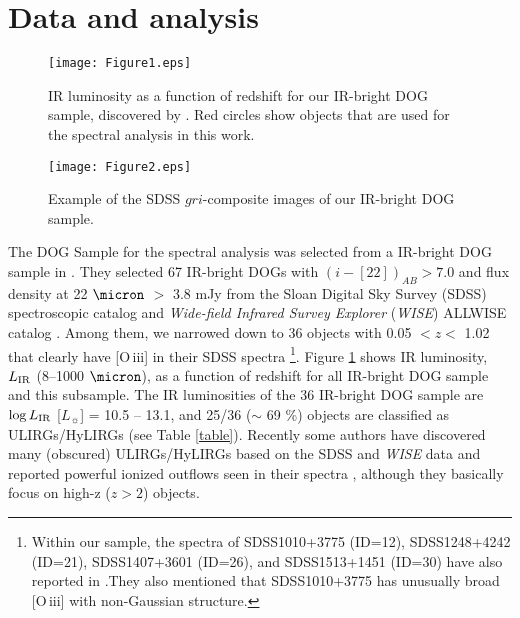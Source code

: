 \documentclass[twocolumn]{aastex6}
\newcommand{\oiii}{[O{\,\sc iii}]\,\,}
\begin{document}
\section{Data and analysis}
\label{DA}
   \begin{figure}
   \centering
   \texttt{[image: Figure1.eps]}
   \caption{IR luminosity as a function of redshift for our IR-bright DOG sample, discovered by \cite{Toba_16}. Red circles show objects that are used for the spectral analysis in this work.}
   \label{LIR}
   \end{figure}
      \begin{figure*}[t]
   \centering
   \texttt{[image: Figure2.eps]}
   \caption{Example of the SDSS $gri$-composite  images of our IR-bright DOG sample.}
   \label{images}
   \end{figure*} 
The DOG Sample for the spectral analysis was selected from a IR-bright DOG sample in \cite{Toba_16}.
They selected 67 IR-bright DOGs with $(i - [22])_{AB} > 7.0$ and flux density at 22 $\micron$ $>$ 3.8 mJy from the Sloan Digital Sky Survey (SDSS) spectroscopic catalog \citep{York,Alam} and {\it Wide-field Infrared Survey Explorer} ({\it WISE}) ALLWISE catalog \citep{Wright,Cutri}.
Among them, we narrowed down to 36 objects with 0.05 $< z <$ 1.02 that clearly have \oiii in their SDSS spectra \footnote{Within our sample, the spectra of SDSS1010+3775 (ID=12), SDSS1248+4242 (ID=21), SDSS1407+3601 (ID=26), and SDSS1513+1451 (ID=30) have also reported in \cite{Ross}.They also mentioned that SDSS1010+3775 has unusually broad \oiii with non-Gaussian structure.}.
Figure \ref{LIR} shows IR luminosity, $L_{\rm IR}$ (8--1000 $\micron$), as a function of redshift for all IR-bright DOG sample and this subsample.
The IR luminosities of the 36 IR-bright DOG sample are $\log L_{\rm IR}$ [$L_{\sun}$] = 10.5 -- 13.1, and 25/36 ($\sim$ 69 \%) objects are classified as ULIRGs/HyLIRGs (see Table \ref{table}).
Recently some authors have discovered many (obscured) ULIRGs/HyLIRGs based on the SDSS and {\it WISE} data and reported powerful ionized outflows seen in their spectra \citep{Ross,Zakamska_16,Bischetti,Hamann,Zhang_S}, although they basically focus on high-z ($z > 2$) objects.
\end{document}
